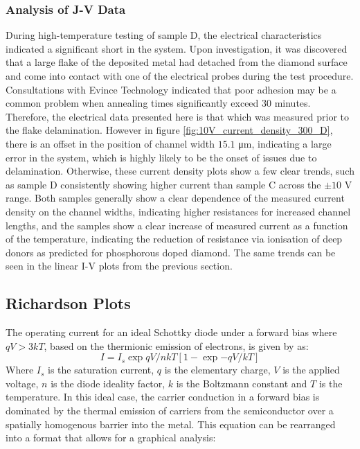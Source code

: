 \subsubsection{Analysis of J-V Data}
During high-temperature testing of sample D, the electrical characteristics indicated a significant short in the system. Upon investigation, it was discovered that a large flake of the deposited metal had detached from the diamond surface and come into contact with one of the electrical probes during the test procedure. Consultations with Evince Technology indicated that poor adhesion may be a common problem when annealing times significantly exceed 30 minutes. Therefore, the electrical data presented here is that which was measured prior to the flake delamination. However in figure \ref{fig:10V_current_density_300_D}, there is an offset in the position of channel width $15.1$ \si{\micro\metre}, indicating a large error in the system, which is highly likely to be the onset of issues due to delamination. Otherwise, these current density plots show a few clear trends, such as sample D consistently showing higher current than sample C across the $\pm10$ \si{\volt} range. Both samples generally show a clear dependence of the measured current density on the channel widths, indicating higher resistances for increased channel lengths, and the samples show a clear increase of measured current as a function of the temperature, indicating the reduction of resistance via ionisation of deep donors as predicted for phosphorous doped diamond. The same trends can be seen in the linear I-V plots from the previous section.

\subsection{Richardson Plots}
The operating current for an ideal Schottky diode under a forward bias where $qV > 3kT$, based on the thermionic emission of electrons, is given by \cite{sze2006} as:
\begin{equation}
    I=I_{s}\exp{qV/nkT}\left[1-\exp{-qV/kT}\right]
\end{equation}
Where $I_{s}$ is the saturation current, $q$ is the elementary charge, $V$ is the applied voltage, $n$ is the diode ideality factor, $k$ is the Boltzmann constant and $T$ is the temperature. In this ideal case, the carrier conduction in a forward bias is dominated by the thermal emission of carriers from the semiconductor over a spatially homogenous barrier into the metal. This equation can be rearranged into a format that allows for a graphical analysis:

